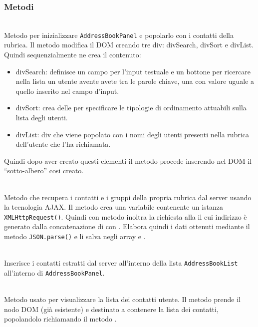 \subsubsection*{Metodi}
\begin{description}	
	
	\item{}\\
	Metodo per inizializzare  \texttt{AddressBookPanel} e popolarlo con i contatti della rubrica. Il metodo modifica il DOM creando tre div: divSearch, divSort e divList. Quindi sequenzialmente ne crea il contenuto:
		\begin{itemize}
			\item divSearch: definisce un campo per l'input testuale e un bottone per ricercare nella lista un utente avente avete tra le parole chiave, una con valore uguale a quello inserito nel campo d'input.
			\item divSort: crea delle  per specificare le tipologie di ordinamento attuabili sulla lista degli utenti.
			\item divList: div che viene popolato con i nomi degli utenti presenti nella rubrica dell'utente che l'ha richiamata.
		\end{itemize}

Quindi dopo aver creato questi elementi il metodo procede inserendo nel DOM il ``sotto-albero'' cosi creato.

	\item{}\\
Metodo che recupera i contatti e i gruppi della propria rubrica dal server usando la tecnologia AJAX. Il metodo crea una variabile contenente un istanza \texttt{XMLHttpRequest()}. Quindi con metodo  inoltra la richiesta alla  il cui indirizzo è generato dalla concatenazione di  con . Elabora quindi i dati ottenuti mediante il metodo \texttt{JSON.parse()} e li salva negli array  e .
	
	\item{}\\
	Inserisce i contatti estratti dal server all'interno della lista \texttt{AddressBookList} all'interno di \texttt{AddressBookPanel}.
	
	\item{}\\
	Metodo usato per visualizzare la lista dei contatti utente. Il metodo prende il nodo DOM (già esistente) e destinato a contenere la lista dei contatti, popolandolo richiamando il metodo .
	

\end{description}
